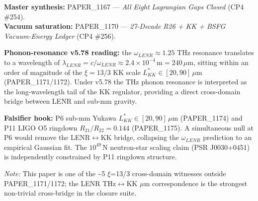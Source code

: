 \documentclass[12pt,a4paper]{article}
\begin{document}
\begin{flushleft}
\textbf{Master synthesis:} PAPER\_1167 --- \emph{All Eight Lagrangian Gaps Closed} (CP4 \#254). \\
\textbf{Vacuum saturation:} PAPER\_1170 --- \emph{27-Decade R26 + KK + BSFG Vacuum-Energy Ledger} (CP4 \#256). \\
\end{flushleft}

\textbf{Phonon-resonance v5.78 reading:} the $\omega_{LENR}\approx 1.25$ THz resonance translates to a wavelength of $\lambda_{LENR} = c/\omega_{LENR} \approx 2.4\times 10^{-4}\,\mathrm{m} = 240\,\mu\mathrm{m}$, sitting within an order of magnitude of the $\xi=13/3$ KK scale $L_{KK}^* \in [20,90]\,\mu\mathrm{m}$ (PAPER\_1171/1172). Under v5.78 the THz phonon resonance is interpreted as the long-wavelength tail of the KK regulator, providing a direct cross-domain bridge between LENR and sub-mm gravity.

\textbf{Falsifier hook:} P6 sub-mm Yukawa $L_{KK}^* \in [20,90]\,\mu\mathrm{m}$ (PAPER\_1174) and P11 LIGO O5 ringdown $R_{21}/R_{22}=0.144$ (PAPER\_1175). A simultaneous null at P6 would remove the LENR$\leftrightarrow$KK bridge, collapsing the $\omega_{LENR}$ prediction to an empirical Gaussian fit. The $10^{49}\,\mathrm{N}$ neutron-star scaling claim (PSR J0030+0451) is independently constrained by P11 ringdown structure.

\emph{Note:} This paper is one of the \textasciitilde{}5 $\xi$=13/3 cross-domain witnesses outside PAPER\_1171/1172; the LENR THz$\leftrightarrow$KK $\mu$m correspondence is the strongest non-trivial cross-bridge in the closure suite.
\end{document}
